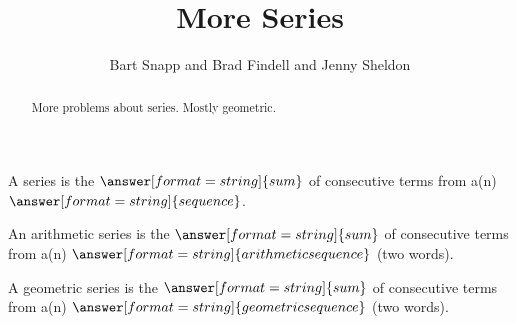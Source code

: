 \documentclass[nooutcomes]{ximera}
\title{More Series}
\author{Bart Snapp and Brad Findell and Jenny Sheldon}
\begin{document}
\begin{abstract}
More problems about series.  Mostly geometric. 
\end{abstract}
\maketitle



\begin{problem}
A series is the $\answer[format=string]{sum}$ of consecutive terms from a(n) $\answer[format=string]{sequence}$.  

An arithmetic series is the $\answer[format=string]{sum}$ of consecutive terms from a(n) $\answer[format=string]{arithmetic sequence}$ (two words).  

A geometric series is the $\answer[format=string]{sum}$ of consecutive terms from a(n) $\answer[format=string]{geometric sequence}$ (two words).  
\end{problem}
\end{document}
